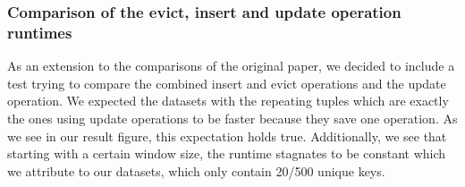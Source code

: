 \subsubsection{Comparison of the evict, insert and update operation runtimes}



As an extension to the comparisons of the original paper, we decided to include a test trying to compare the combined insert and evict operations and the update operation.
We expected the datasets with the repeating tuples which are exactly the ones using update operations to be faster because they save one operation.
As we see in our result figure, this expectation holds true.
Additionally, we see that starting with a certain window size, the runtime stagnates to be constant which we attribute to our datasets, which only contain 20/500 unique keys.
